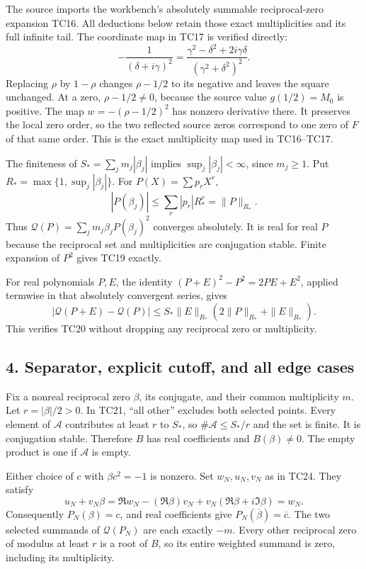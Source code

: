 The source imports the workbench's absolutely summable reciprocal-zero expansion TC16. All deductions below retain those exact multiplicities and its full infinite tail. The coordinate map in TC17 is verified directly: \[
-\frac1{(\delta+i\gamma)^2}
=\frac{\gamma^2-\delta^2+2i\gamma\delta}
{(\gamma^2+\delta^2)^2}.
\tag{TR12}
\] Replacing \(\rho\) by \(1-\rho\) changes \(\rho-1/2\) to its negative and leaves the square unchanged. At a zero, \(\rho-1/2\ne0\), because the source value \(g(1/2)=M_0\) is positive. The map \(w=-(\rho-1/2)^2\) has nonzero derivative there. It preserves the local zero order, so the two reflected source zeros correspond to one zero of \(F\) of that same order. This is the exact multiplicity map used in TC16--TC17.

The finiteness of \(S_*=\sum_jm_j|\beta_j|\) implies \(\sup_j|\beta_j|<\infty\), since \(m_j\ge1\). Put \(R_*=\max\{1,\sup_j|\beta_j|\}\). For \(P(X)=\sum p_rX^r\), \[
|P(\beta_j)|\le\sum_r|p_r|R_*^r=\|P\|_{R_*}.
\tag{TR13}
\] Thus \(\mathcal Q(P)=\sum_jm_j\beta_jP(\beta_j)^2\) converges absolutely. It is real for real \(P\) because the reciprocal set and multiplicities are conjugation stable. Finite expansion of \(P^2\) gives TC19 exactly.

For real polynomials \(P,E\), the identity \((P+E)^2-P^2=2PE+E^2\), applied termwise in that absolutely convergent series, gives \[
|\mathcal Q(P+E)-\mathcal Q(P)|
\le S_*\|E\|_{R_*}(2\|P\|_{R_*}+\|E\|_{R_*}).
\tag{TR14}
\] This verifies TC20 without dropping any reciprocal zero or multiplicity.

\subsection{4. Separator, explicit cutoff, and all edge cases}\label{separator-explicit-cutoff-and-all-edge-cases}

Fix a nonreal reciprocal zero \(\beta\), its conjugate, and their common multiplicity \(m\). Let \(r=|\beta|/2>0\). In TC21, ``all other'' excludes both selected points. Every element of \(\mathcal A\) contributes at least \(r\) to \(S_*\), so \(\#\mathcal A\le S_*/r\) and the set is finite. It is conjugation stable. Therefore \(B\) has real coefficients and \(B(\beta)\ne0\). The empty product is one if \(\mathcal A\) is empty.

Either choice of \(c\) with \(\beta c^2=-1\) is nonzero. Set \(w_N,u_N,v_N\) as in TC24. They satisfy \[
u_N+v_N\beta
=\Re w_N-(\Re\beta)v_N+v_N(\Re\beta+i\Im\beta)
=w_N.
\tag{TR15}
\] Consequently \(P_N(\beta)=c\), and real coefficients give \(P_N(\overline\beta)=\overline c\). The two selected summands of \(\mathcal Q(P_N)\) are each exactly \(-m\). Every other reciprocal zero of modulus at least \(r\) is a root of \(B\), so its entire weighted summand is zero, including its multiplicity.

